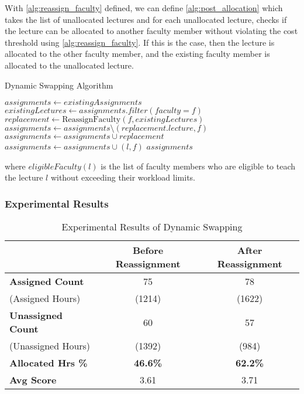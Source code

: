 With \autoref{alg:reassign_faculty} defined, we can define \autoref{alg:post_allocation} which takes the list of unallocated lectures and for each unallocated lecture, checks if the lecture can be allocated to another faculty member without violating the cost threshold using \autoref{alg:reassign_faculty}. If this is the case, then the lecture is allocated to the other faculty member, and the existing faculty member is allocated to the unallocated lecture.

\begin{algorithm}[H]
  \caption{Dynamic Swapping Algorithm}
  \begin{algorithmic}[1]
    \State $assignments \gets existingAssignments$
    \State $existingLectures \gets assignments.filter(faculty=f)$
    \State $replacement \gets \text{ReassignFaculty}(f, existingLectures)$
    \State $assignments \gets assignments \setminus (replacement.lecture, f)$
    \State $assignments \gets assignments \cup replacement$
    \State $assignments \gets assignments \cup (l, f)$
    \EndIf
    \EndFor
    \EndFor
    \State \Return $assignments$
    \EndProcedure
  \end{algorithmic}
  \label{alg:post_allocation}
\end{algorithm}

where $eligibleFaculty(l)$ is the list of faculty members who are eligible to teach the lecture $l$ without exceeding their workload limits.

\subsubsection{Experimental Results}

\begin{table}[H]
  \centering
  \begin{tabular}{|l|c|c|}
    \hline
    \textbf{}                 & \textbf{Before Reassignment} & \textbf{After Reassignment} \\ \hline
    \textbf{Assigned Count}   & 75                           & 78                          \\
    (Assigned Hours)          & (1214)                       & (1622)                      \\
    \textbf{Unassigned Count} & 60                           & 57                          \\
    (Unassigned Hours)        & (1392)                       & (984)                       \\
    \textbf{Allocated Hrs \%} & \textbf{46.6\%}              & \textbf{62.2\%}             \\
    \textbf{Avg Score}        & 3.61                         & 3.71                        \\
    \hline
  \end{tabular}
  \caption{Experimental Results of Dynamic Swapping}
  \label{tab:post_allocation_results}
\end{table}

